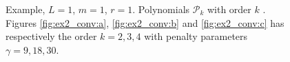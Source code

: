 \begin{figure}
    \caption{ Example, $L=1$, $m=1$, $r=1$. Polynomials $\mathcal{P}_{k} $ with order $k$ . Figures \ref{fig:ex2_conv:a}, \ref{fig:ex2_conv:b} and \ref{fig:ex2_conv:c} has respectively the order $k=2,3, 4$ with penalty parameters $\gamma = 9,18,30 $.  }
    \label{fig:ex2_conv}
\end{figure}



